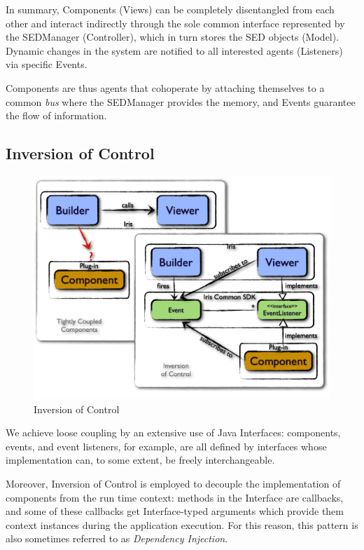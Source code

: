 \documentclass[5p]{elsarticle}
\begin{document}
In summary, Components (Views) can be completely disentangled from each other and interact indirectly through the sole common interface represented by the SEDManager (Controller), which in turn stores the SED objects (Model). Dynamic changes in the system are notified to all interested agents (Listeners) via specific Events.

Components are thus agents that cohoperate by attaching themselves to a common \emph{bus} where the SEDManager provides the memory, and Events guarantee the flow of information.

\subsection{Inversion of Control}

\begin{figure}
\begin{center}
\includegraphics[width=\columnwidth]{figures/IrisDiagrams.002.png}
\caption{Inversion of Control}
\end{center}
\end{figure}

We achieve loose coupling by an extensive use of Java Interfaces: components, events, and event listeners, for example, are all defined by interfaces whose implementation can, to some extent, be freely interchangeable.

Moreover, Inversion of Control is employed to decouple the implementation of components from the run time context: methods in the Interface are callbacks, and some of these callbacks get Interface-typed arguments which provide them context instances during the application execution. For this reason, this pattern is also sometimes referred to as \emph{Dependency Injection}.
\end{document}
